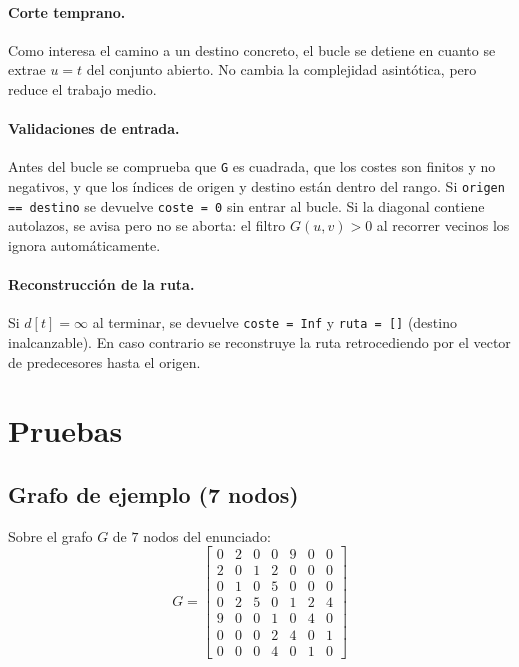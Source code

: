\paragraph{Corte temprano.} Como interesa el camino a un destino concreto, el bucle se detiene en cuanto se extrae $u = t$ del conjunto abierto. No cambia la complejidad asint\'{o}tica, pero reduce el trabajo medio.

\paragraph{Validaciones de entrada.} Antes del bucle se comprueba que \texttt{G} es cuadrada, que los costes son finitos y no negativos, y que los \'{i}ndices de origen y destino est\'{a}n dentro del rango. Si \texttt{origen == destino} se devuelve \texttt{coste = 0} sin entrar al bucle. Si la diagonal contiene autolazos, se avisa pero no se aborta: el filtro $G(u,v) > 0$ al recorrer vecinos los ignora autom\'{a}ticamente.

\paragraph{Reconstrucci\'{o}n de la ruta.} Si $d[t] = \infty$ al terminar, se devuelve \texttt{coste = Inf} y \texttt{ruta = []} (destino inalcanzable). En caso contrario se reconstruye la ruta retrocediendo por el vector de predecesores hasta el origen.


\section{Pruebas}

\subsection{Grafo de ejemplo (7 nodos)}
Sobre el grafo $G$ de $7$ nodos del enunciado:
\begin{equation*}
  G = \begin{bmatrix}
    0 & 2 & 0 & 0 & 9 & 0 & 0 \\
    2 & 0 & 1 & 2 & 0 & 0 & 0 \\
    0 & 1 & 0 & 5 & 0 & 0 & 0 \\
    0 & 2 & 5 & 0 & 1 & 2 & 4 \\
    9 & 0 & 0 & 1 & 0 & 4 & 0 \\
    0 & 0 & 0 & 2 & 4 & 0 & 1 \\
    0 & 0 & 0 & 4 & 0 & 1 & 0
  \end{bmatrix}
\end{equation*}

